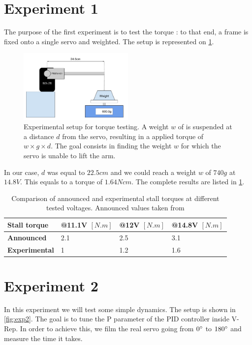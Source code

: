 \section{Experiment 1 \label{sec:exp1}}
The purpose of the first experiment is to test the torque : to that end, a frame is fixed onto a single servo and weighted. The setup is represented on \cref{fig:exp1}.

\begin{figure}[htp]
\center
    \includegraphics[width = 0.5\textwidth]{figures/exp1}
    \caption[Experimental setup for torque testing]{Experimental setup for torque testing. A weight $w$ of is suspended at a distance $d$ from the servo, resulting in a applied torque of $w \times g \times d$. The goal consists in finding the weight $w$ for which the servo is unable to lift the arm.}
    \label{fig:exp1}
\end{figure}

In our case, $d$ was equal to $22.5cm$ and we could reach a weight $w$ of $740g$ at $14.8V$. This equals to a torque of $1.64Ncm$. The complete results are listed in \cref{table:exp1_results}.
\begin{table}[htp]
\center
\begin{tabularx}{\textwidth}{@{}l X X X @{}}
\toprule
\textbf{Stall torque} & \textbf{@11.1V $[N.m]$} & \textbf{@12V $[N.m]$} & \textbf{@14.8V $[N.m]$}\\ 
\midrule
\textbf{Announced} & 2.1 & 2.5 & 3.1\\ 
\textbf{Experimental} & 1 & 1.2 & 1.6\\ 
\bottomrule
\end{tabularx}
\caption[Results of experiment 1]{Comparison of announced and experimental stall torques at different tested voltages. Announced values taken from \cite{mx_28_manual}}
\label{table:exp1_results}
\end{table}

\section{Experiment 2}
In this experiment we will test some simple dynamics. The setup is shown in \cref{fig:exp2}. The goal is to tune the P parameter of the PID controller inside V-Rep. In order to achieve this, we film the real servo going from $0\degree$ to $180\degree$ and measure the time it takes. 

